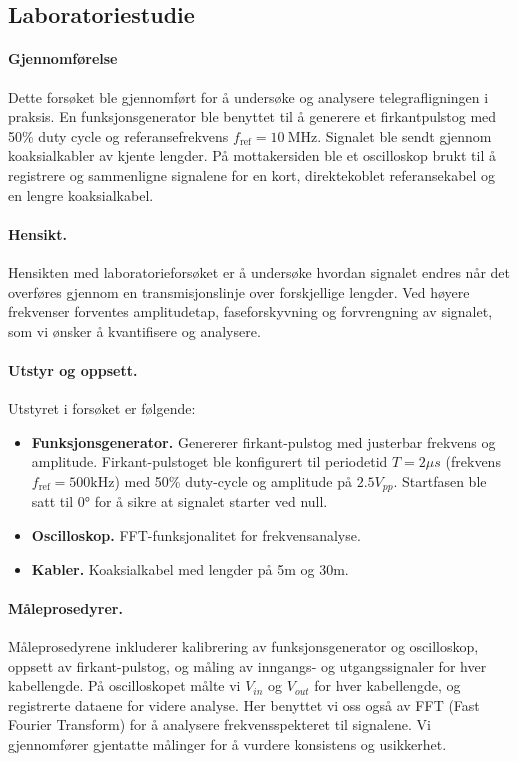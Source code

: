 \subsection{Laboratoriestudie}
\paragraph{Gjennomførelse}
Dette forsøket ble gjennomført for å undersøke og analysere telegrafligningen i praksis. En funksjonsgenerator ble benyttet til å generere et firkantpulstog med 50\% duty cycle og referansefrekvens $f_\mathrm{ref} = 10~\mathrm{MHz}$. Signalet ble sendt gjennom koaksialkabler av kjente lengder. På mottakersiden ble et oscilloskop brukt til å registrere og sammenligne signalene for en kort, direktekoblet referansekabel og en lengre koaksialkabel.

\paragraph{Hensikt.} Hensikten med laboratorieforsøket er å undersøke hvordan signalet endres når det overføres gjennom en transmisjonslinje over forskjellige lengder. Ved høyere frekvenser forventes amplitudetap, faseforskyvning og forvrengning av signalet, som vi ønsker å kvantifisere og analysere.

\paragraph{Utstyr og oppsett.}
Utstyret i forsøket er følgende:
\begin{itemize}
    \item \textbf{Funksjonsgenerator.} Genererer firkant-pulstog med justerbar frekvens og amplitude. Firkant-pulstoget ble konfigurert til periodetid $T = 2 \mu s$ (frekvens $f_\mathrm{ref} = 500 \mathrm{kHz}$) med 50\% duty-cycle og amplitude på $2.5V_{pp}$. Startfasen ble satt til $0\si{\degree}$ for å sikre at signalet starter ved null.
    \item \textbf{Oscilloskop.} FFT-funksjonalitet for frekvensanalyse.
    \item \textbf{Kabler.} Koaksialkabel med lengder på 5m og 30m.
\end{itemize}

\paragraph{Måleprosedyrer.}
Måleprosedyrene inkluderer kalibrering av funksjonsgenerator og oscilloskop, oppsett av firkant-pulstog, og måling av inngangs- og utgangssignaler for hver kabellengde. På oscilloskopet målte vi $V_{in}$ og $V_{out}$ for hver kabellengde, og registrerte dataene for videre analyse. Her benyttet vi oss også av FFT (Fast Fourier Transform) for å analysere frekvensspekteret til signalene. Vi gjennomfører gjentatte målinger for å vurdere konsistens og usikkerhet.

